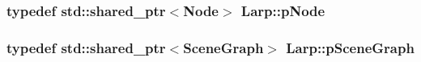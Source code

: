 \subsubsection[{\texorpdfstring{p\+Node}{pNode}}]{\setlength{\rightskip}{0pt plus 5cm}typedef std\+::shared\+\_\+ptr$<${\bf Node}$>$ {\bf Larp\+::p\+Node}}\hypertarget{namespaceLarp_a57e9a3e29e68cdf508c964274d9ac1a4}{}\label{namespaceLarp_a57e9a3e29e68cdf508c964274d9ac1a4}
\subsubsection[{\texorpdfstring{p\+Scene\+Graph}{pSceneGraph}}]{\setlength{\rightskip}{0pt plus 5cm}typedef std\+::shared\+\_\+ptr$<${\bf Scene\+Graph}$>$ {\bf Larp\+::p\+Scene\+Graph}}\hypertarget{namespaceLarp_a590f73362521ab6a9c682d4eb2719002}{}\label{namespaceLarp_a590f73362521ab6a9c682d4eb2719002}
